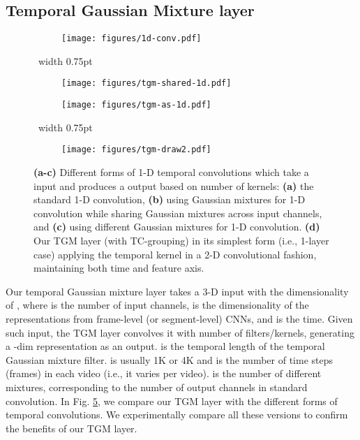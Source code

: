 \documentclass{article}
\newcommand{\rulesep}{\unskip\ \vrule width 0.75pt\ }
\begin{document}
\subsection{Temporal Gaussian Mixture layer}
\begin{figure}
\centering
  \begin{subfigure}{.23\textwidth}
  \centering
    \texttt{[image: figures/1d-conv.pdf]}
    \caption{}\label{fig:conv1d}
  \end{subfigure}\rulesep \begin{subfigure}{.23\textwidth}
  \centering
    \texttt{[image: figures/tgm-shared-1d.pdf]}
    \caption{}\label{fig:tgm-shared-1d}
  \end{subfigure}
  
  \begin{subfigure}{.23\textwidth}
  \centering
    \texttt{[image: figures/tgm-as-1d.pdf]}
    \caption{}\label{fig:tgm-as-1d}
  \end{subfigure}\rulesep \begin{subfigure}{.23\textwidth}
  \centering
    \texttt{[image: figures/tgm-draw2.pdf]}
    \caption{}\label{fig:real-tgm}
  \end{subfigure}
  \caption{{\bf (a-c)} Different forms of 1-D temporal convolutions which take a  input and produces a  output based on  number of  kernels: {\bf (a)} the standard 1-D convolution, {\bf (b)} using Gaussian mixtures for 1-D convolution while sharing Gaussian mixtures across input channels, and {\bf (c)} using  different Gaussian mixtures for 1-D convolution. {\bf (d)} Our TGM layer (with TC-grouping) in its simplest form (i.e., 1-layer case) applying the  temporal kernel in a 2-D convolutional fashion, maintaining both time and feature axis.}
  \label{fig:various-baselines}
\end{figure}


Our temporal Gaussian mixture layer takes a 3-D input with the dimensionality of , where  is the number of input channels,  is the dimensionality of the representations from frame-level (or segment-level) CNNs, and  is the time. Given such input, the TGM layer convolves it with  number of  filters/kernels, generating a -dim representation as an output.  is the temporal length of the temporal Gaussian mixture filter.  is usually 1K or 4K and  is the number of time steps (frames) in each video (i.e., it varies per video).  is the number of different mixtures, corresponding to the number of output channels in standard convolution. In Fig. \ref{fig:various-baselines}, we compare our TGM layer with the different forms of temporal convolutions.
We experimentally compare all these versions to confirm the benefits of our TGM layer.
\end{document}

